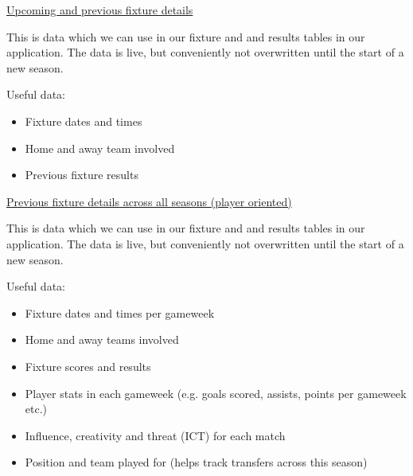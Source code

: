 \documentclass[12pt, a4paper, oneside]{book}
\numberwithin{equation}{section}
\begin{document}
\vspace{0.5cm}

\href{https://fantasy.premierleague.com/api/fixtures/}{Upcoming and previous fixture details}

\vspace{0.5cm}

This is data which we can use in our fixture and and results tables in our application. The data is live, but conveniently not overwritten until the start of a new season.

\vspace{0.5cm}

Useful data:

\begin{itemize}
  \item Fixture dates and times
  \item Home and away team involved
  \item Previous fixture results
\end{itemize}

\vspace{0.5cm}

\href{https://github.com/vaastav/Fantasy-Premier-League/blob/master/data/2021-22/gws/merged_gw.csv}{Previous fixture details across all seasons (player oriented)}

\vspace{0.5cm}

This is data which we can use in our fixture and and results tables in our application. The data is live, but conveniently not overwritten until the start of a new season.

\vspace{0.5cm}

Useful data:

\begin{itemize}
  \item Fixture dates and times per gameweek
  \item Home and away teams involved
  \item Fixture scores and results
  \item Player stats in each gameweek (e.g. goals scored, assists, points per gameweek etc.)
  \item Influence, creativity and threat (ICT) for each match
  \item Position and team played for (helps track transfers across this season)
\end{itemize}

\vspace{0.5cm}
\end{document}

